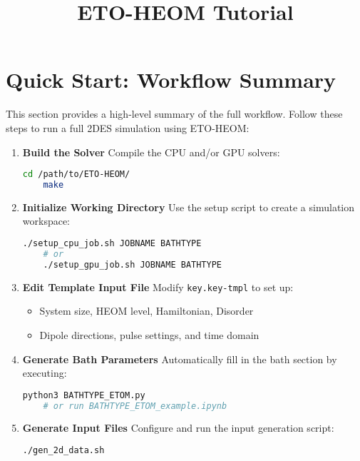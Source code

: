 \documentclass{article}
\title{ETO-HEOM Tutorial}
\begin{document}
\maketitle

\section*{Quick Start: Workflow Summary}

This section provides a high-level summary of the full workflow. Follow these steps to run a full 2DES simulation using ETO-HEOM:

\begin{enumerate}
    \item \textbf{Build the Solver}  
    Compile the CPU and/or GPU solvers:
    \begin{lstlisting}[language=bash]
    cd /path/to/ETO-HEOM/
    make
    \end{lstlisting}

    \item \textbf{Initialize Working Directory}  
    Use the setup script to create a simulation workspace:
    \begin{lstlisting}[language=bash]
    ./setup_cpu_job.sh JOBNAME BATHTYPE
    # or
    ./setup_gpu_job.sh JOBNAME BATHTYPE
    \end{lstlisting}

    \item \textbf{Edit Template Input File}  
    Modify \texttt{key.key-tmpl} to set up:
    \begin{itemize}
        \item System size, HEOM level, Hamiltonian, Disorder
        \item Dipole directions, pulse settings, and time domain
    \end{itemize}

    \item \textbf{Generate Bath Parameters}  
    Automatically fill in the bath section by executing:
    \begin{lstlisting}[language=bash]
    python3 BATHTYPE_ETOM.py
    # or run BATHTYPE_ETOM_example.ipynb
    \end{lstlisting}

    \item \textbf{Generate Input Files}  
    Configure and run the input generation script:
    \begin{lstlisting}[language=bash]
    ./gen_2d_data.sh
    \end{lstlisting}


\end{enumerate}
\end{document}
